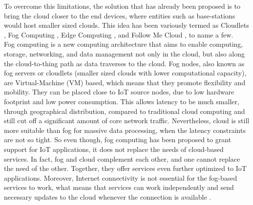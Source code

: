 \noindent\tab To overcome this limitations, the solution that has already been proposed is to bring the cloud closer to the end devices, where entities such as base-stations would host smaller sized clouds. This idea has been variously termed as Cloudlets \cite{satyanarayanan2013cloudlets}, Fog Computing \cite{bonomi2012fog}, Edge Computing \cite{davy2014challenges}, and Follow Me Cloud \cite{taleb2013follow}, to name a few.\\
\noindent\tab Fog computing is a new computing architecture that aims to enable computing, storage, networking, and data management not only in the cloud, but also along the cloud-to-thing path as data traverses to the cloud. Fog nodes, also known as fog servers or cloudlets (smaller sized clouds with lower computational capacity), are Virtual-Machine (VM) based, which means that they promote flexibility and mobility. They can be placed close to IoT source nodes, due to low hardware footprint and low power consumption. This allows latency to be much smaller, through geographical distribution, compared to traditional cloud computing and still cut off a significant amount of core network traffic. Nevertheless, cloud is still more suitable than fog for massive data processing, when the latency constraints are not so tight. So even though, fog computing has been proposed to grant support for IoT applications, it does not replace the needs of cloud-based services. In fact, fog and cloud complement each other, and one cannot replace the need of the other. Together, they offer services even further optimized to IoT applications. Moreover, Internet connectivity is not essential for the fog-based services to work, what means that services can work independently and send necessary updates to the cloud whenever the connection is available \cite{yousefpour2018all}.

